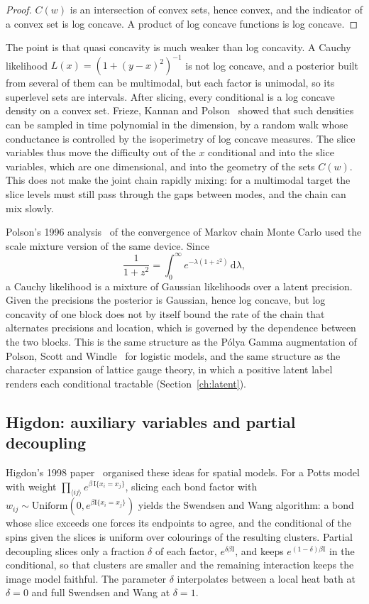 \begin{proof}
$C(w)$ is an intersection of convex sets, hence convex, and the indicator of a convex set is log concave. A product of log concave functions is log concave.
\end{proof}

The point is that quasi concavity is much weaker than log concavity. A Cauchy likelihood $L(x)=(1+(y-x)^2)^{-1}$ is not log concave, and a posterior built from several of them can be multimodal, but each factor is unimodal, so its superlevel sets are intervals. After slicing, every conditional is a log concave density on a convex set. Frieze, Kannan and Polson~\cite{FKP} showed that such densities can be sampled in time polynomial in the dimension, by a random walk whose conductance is controlled by the isoperimetry of log concave measures. The slice variables thus move the difficulty out of the $x$ conditional and into the slice variables, which are one dimensional, and into the geometry of the sets $C(w)$. This does not make the joint chain rapidly mixing: for a multimodal target the slice levels must still pass through the gaps between modes, and the chain can mix slowly.

Polson's 1996 analysis~\cite{Po96} of the convergence of Markov chain Monte Carlo used the scale mixture version of the same device. Since
\[
\frac{1}{1+z^2}=\int_0^\infty e^{-\lambda(1+z^2)}\,\mathrm d\lambda,
\]
a Cauchy likelihood is a mixture of Gaussian likelihoods over a latent precision. Given the precisions the posterior is Gaussian, hence log concave, but log concavity of one block does not by itself bound the rate of the chain that alternates precisions and location, which is governed by the dependence between the two blocks. This is the same structure as the P\'olya Gamma augmentation of Polson, Scott and Windle~\cite{PSW13} for logistic models, and the same structure as the character expansion of lattice gauge theory, in which a positive latent label renders each conditional tractable (Section~\ref{ch:latent}).

\subsection{Higdon: auxiliary variables and partial decoupling}\label{sec:c5higdon}

Higdon's 1998 paper~\cite{Hi98} organised these ideas for spatial models. For a Potts model with weight $\prod_{\langle ij\rangle}e^{\beta\,\mathrm I\{x_i=x_j\}}$, slicing each bond factor with $w_{ij}\sim\mathrm{Uniform}(0,e^{\beta\mathrm I\{x_i=x_j\}})$ yields the Swendsen and Wang algorithm: a bond whose slice exceeds one forces its endpoints to agree, and the conditional of the spins given the slices is uniform over colourings of the resulting clusters. Partial decoupling slices only a fraction $\delta$ of each factor, $e^{\delta\beta\mathrm I}$, and keeps $e^{(1-\delta)\beta\mathrm I}$ in the conditional, so that clusters are smaller and the remaining interaction keeps the image model faithful. The parameter $\delta$ interpolates between a local heat bath at $\delta=0$ and full Swendsen and Wang at $\delta=1$.

